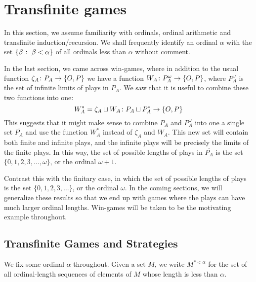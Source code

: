 \documentclass[11pt]{article} %
\begin{document}
\section{Transfinite games}

\begin{note}
  In this section, we assume familiarity with ordinals, ordinal arithmetic and transfinite induction/recursion.  We shall frequently identify an ordinal $\alpha$ with the set $\{\beta\;\colon\;\beta<\alpha\}$ of all ordinals less than $\alpha$ without comment.
\end{note}

In the last section, we came across win-games, where in addition to the usual function $\zeta_A\colon{}P_A\to{}\{O,P\}$ we have a function $W_A\colon{}P_A^\omega\to{}\{O,P\}$, where $P_A^\omega$ is the set of infinite limits of plays in $P_A$.  We saw that it is useful to combine these two functions into one:
\[
  W_A^* = \zeta_A\sqcup W_A\colon P_A\sqcup P_A^*\to\{O,P\}
  \]
This suggests that it might make sense to combine $P_A$ and $P_A^\omega$ into one a single set $\overline{P_A}$ and use the function $W_A^*$ instead of $\zeta_A$ and $W_A$.  This new set will contain both finite and infinite plays, and the infinite plays will be precisely the limits of the finite plays.  In this way, the set of possible lengths of plays in $\overline{P_A}$ is the set $\{0,1,2,3,\dots,\omega\}$, or the ordinal $\omega+1$.  

Contrast this with the finitary case, in which the set of possible lengths of plays is the set $\{0,1,2,3,\dots\}$, or the ordinal $\omega$.  In the coming sections, we will generalize these results so that we end up with games where the plays can have much larger ordinal lengths.  Win-games will be taken to be the motivating example throughout.  

\subsection{Transfinite Games and Strategies}

We fix some ordinal $\alpha$ throughout.  Given a set $M$, we write $M^{*<\alpha}$ for the set of all ordinal-length sequences of elements of $M$ whose length is less than $\alpha$.  
\end{document}
